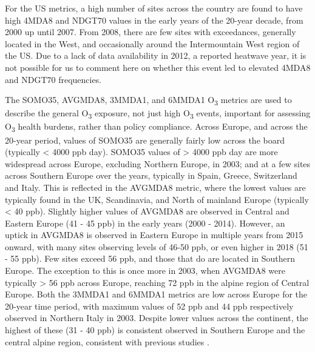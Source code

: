 \documentclass[journal abbreviation, manuscript]{copernicus}
\begin{document}
For the US metrics, a high number of sites across the country are found to have high 4MDA8 and NDGT70 values in the early years of the 20-year decade, from 2000 up until 2007. From 2008, there are few sites with exceedances, generally located in the West, and occasionally around the Intermountain West region of the US. Due to a lack of data availability in 2012, a reported heatwave year, it is not possible for us to comment here on whether this event led to elevated 4MDA8 and NDGT70 frequencies. 

The SOMO35, AVGMDA8, 3MMDA1, and 6MMDA1 O\textsubscript{3} metrics are used to describe the general O\textsubscript{3} exposure, not just high O\textsubscript{3} events, important for assessing O\textsubscript{3} health burdens, rather than policy compliance. Across Europe, and across the 20-year period, values of SOMO35 are generally fairly low across the board (typically < 4000 ppb day). SOMO35 values of > 4000 ppb day are more widespread across Europe, excluding Northern Europe, in 2003; and at a few sites across Southern Europe over the years, typically in Spain, Greece, Switzerland and Italy. This is reflected in the AVGMDA8 metric, where the lowest values are typically found in the UK, Scandinavia, and North of mainland Europe (typically < 40 ppb). Slightly higher values of AVGMDA8 are observed in Central and Eastern Europe (41 - 45 ppb) in the early years (2000 - 2014). However, an uptick in AVGMDA8 is observed in Eastern Europe in multiple years from 2015 onward, with many sites observing levels of 46-50 ppb, or even higher in 2018 (51 - 55 ppb). Few sites exceed 56 ppb, and those that do are located in Southern Europe. The exception to this is once more in 2003, when AVGMDA8 were typically > 56 ppb across Europe, reaching 72 ppb in the alpine region of Central Europe. Both the 3MMDA1 and 6MMDA1 metrics are low across Europe for the 20-year time period, with maximum values of 52 ppb and 44 ppb respectively observed in Northern Italy in 2003. Despite lower values across the continent, the highest of these (31 - 40 ppb) is consistent observed in Southern Europe and the central alpine region, consistent with previous studies \citep{WangKeding2024}.
\end{document}
